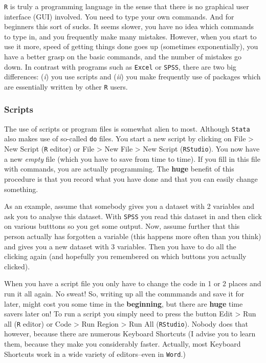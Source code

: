 \documentclass[]{article}
\begin{document}
\texttt{R} is truly a programming language in the sense that there is no
graphical user interface (GUI) involved. You need to type your own
commands. And for beginners this sort of sucks. It seems slower, you
have no idea which commands to type in, and you frequently make many
mistakes. However, when you start to use it more, speed of getting
things done goes up (sometimes exponentially), you have a better grasp
on the basic commands, and the number of mistakes go down. In contrast
with programs such as \texttt{Excel} or \texttt{SPSS}, there are two big
differences: (\emph{i}) you use scripts and (\emph{ii}) you make
frequently use of packages which are essentially written by other
\texttt{R} users.

\subsubsection{Scripts}\label{subsec:scripts}

The use of scripts or program files is somewhat alien to most. Although
\texttt{Stata} also makes use of so-called \texttt{do} files. You start
a new script by clicking on File \textgreater{} New Script (\texttt{R}
editor) or File \textgreater{} New File \textgreater{} New Script
(\texttt{RStudio}). You now have a new \emph{empty} file (which you have
to save from time to time). If you fill in this file with commands, you
are actually programming. The \textbf{huge} benefit of this procedure is
that you record what you have done and that you can easily change
something.

As an example, assume that somebody gives you a dataset with 2 variables
and ask you to analyse this dataset. With \texttt{SPSS} you read this
dataset in and then click on various butttons so you get some output.
Now, assume further that this person actually has forgotten a variable
(this happens more often than you think) and gives you a new dataset
with 3 variables. Then you have to do all the clicking again (and
hopefully you remembered on which buttons you actually clicked).

When you have a script file you only have to change the code in 1 or 2
places and run it all again. No sweat! So, writing up all the commmands
and save it for later, might cost you some time in the
\textbf{beginning}, but there are \textbf{huge} time savers later on! To
run a script you simply need to press the button Edit \textgreater{} Run
all (\texttt{R} editor) or Code \textgreater{} Run Region \textgreater{}
Run All (\texttt{RStudio}). Nobody does that however, because there are
numerous Keyboard Shortcuts (I advise you to learn them, because they
make you considerably faster. Actually, most Keyboard Shortcuts work in
a wide variety of editors--even in \texttt{Word}.)
\end{document}
